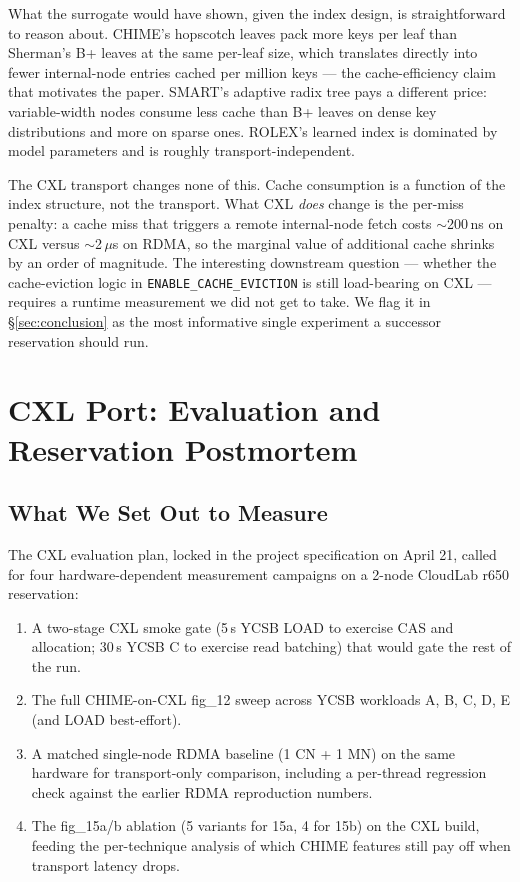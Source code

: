 \documentclass[11pt,a4paper]{article}
\begin{document}
What the surrogate would have shown, given the index design, is straightforward to reason about. CHIME's hopscotch leaves pack more keys per leaf than Sherman's B+ leaves at the same per-leaf size, which translates directly into fewer internal-node entries cached per million keys --- the cache-efficiency claim that motivates the paper. SMART's adaptive radix tree pays a different price: variable-width nodes consume less cache than B+ leaves on dense key distributions and more on sparse ones. ROLEX's learned index is dominated by model parameters and is roughly transport-independent.

The CXL transport changes none of this. Cache consumption is a function of the index structure, not the transport. What CXL \emph{does} change is the per-miss penalty: a cache miss that triggers a remote internal-node fetch costs $\sim$200\,ns on CXL versus $\sim$2\,$\mu$s on RDMA, so the marginal value of additional cache shrinks by an order of magnitude. The interesting downstream question --- whether the cache-eviction logic in \texttt{ENABLE\_CACHE\_EVICTION} is still load-bearing on CXL --- requires a runtime measurement we did not get to take. We flag it in §\ref{sec:conclusion} as the most informative single experiment a successor reservation should run.

\section{CXL Port: Evaluation and Reservation Postmortem}
\label{sec:postmortem}


\subsection{What We Set Out to Measure}

The CXL evaluation plan, locked in the project specification on April 21, called for four hardware-dependent measurement campaigns on a 2-node CloudLab r650 reservation:

\begin{enumerate}[nosep]
    \item A two-stage CXL smoke gate (5\,s YCSB LOAD to exercise CAS and allocation; 30\,s YCSB C to exercise read batching) that would gate the rest of the run.
    \item The full CHIME-on-CXL fig\_12 sweep across YCSB workloads A, B, C, D, E (and LOAD best-effort).
    \item A matched single-node RDMA baseline (1 CN + 1 MN) on the same hardware for transport-only comparison, including a per-thread regression check against the earlier RDMA reproduction numbers.
    \item The fig\_15a/b ablation (5 variants for 15a, 4 for 15b) on the CXL build, feeding the per-technique analysis of which CHIME features still pay off when transport latency drops.
\end{enumerate}
\end{document}
